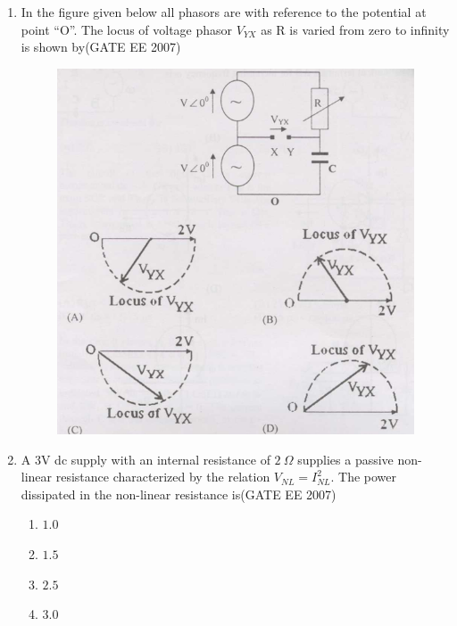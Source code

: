 \documentclass[a4paper,10pt]{exam}
\theoremstyle{remark}
\begin{document}
\begin{enumerate}
\begin{figure}[H]
\end{figure}
\vfill
{}
\newpage
\item \quad In the figure given below all phasors are with reference to the potential at point ``O''. The locus of voltage phasor $V_{YX}$ as R is varied from zero to infinity is shown by\hfill{(GATE EE 2007)} 

\begin{figure}[H]
    \centering
    \includegraphics[width=1\linewidth]{figs/Q 63.png} \caption{}     \label{fig:myfigure}
\end{figure}
\vspace{1cm}
\item  \quad A 3V dc supply with an internal resistance of $2~\Omega$ supplies a passive non-linear resistance characterized by the relation $V_{NL} = I_{NL}^2$. The power dissipated in the non-linear resistance is\hfill{(GATE EE 2007)} 

\begin{multicols}{4}
\begin{enumerate}
    \item $1.0$  
\item $1.5$ 
\item $2.5$ 
\item $3.0$ 
\end{enumerate}
\end{multicols}


\end{enumerate}
\end{document}
